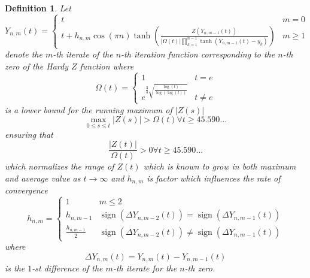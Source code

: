 \documentclass{elsarticle}
\newcommand{\tmop}[1]{\ensuremath{\operatorname{#1}}}
\newtheorem{definition}{Definition}
\begin{document}
\begin{definition}
  Let
  \[ Y_{n, m} (t) = \left\{ \begin{array}{ll}
       t & m = 0\\
       t + h_{n, m} \cos (\pi n) \tanh \left( \frac{Z (Y_{n, m - 1} (t))}{|
       \Omega (t) | \prod_{k = 1}^{n - 1} \tanh (Y_{n, m - 1} (t) - y_k)}
       \right) & m \geqslant 1
     \end{array} \right. \]
  denote the $m$-th iterate of the $n$-th iteration function corresponding to
  the $n$-th zero of the Hardy $Z$ function where
  \begin{equation}
    \Omega (t) = \left\{ \begin{array}{ll}
      1 & t = e\\
      e^{\frac{3}{4} \sqrt{\frac{\log (t)}{\log (\log (t))}}} & t \neq e
    \end{array} \right.
  \end{equation}
  is a lower bound for the running maximum of $| Z (s) |$
  \begin{equation}
    \max_{0 \leqslant s \leqslant t} | Z (s) | > \Omega (t) \forall t
    \geqslant 45.590 \ldots
  \end{equation}
  ensuring that
  \begin{equation}
    \frac{| Z (t) |}{\Omega (t)} > 0 \forall t \geqslant 45.590 \ldots
  \end{equation}
  which normalizes the range of $Z (t)$ which is known to grow in both maximum
  and average value as $t \rightarrow \infty$ and $h_{n, m}$ is factor which
  influences the rate of convergence
  \begin{equation}
    h_{n, m} = \left\{ \begin{array}{ll}
      1 & m \leqslant 2\\
      h_{n, m - 1} & \tmop{sign} (\Delta Y^{}_{n, m - 2} (t)) = \tmop{sign}
      (\Delta Y^{}_{n, m - 1} (t))\\
      \frac{h_{n, m - 1}}{2} & \tmop{sign} (\Delta Y^{}_{n, m - 2} (t)) \neq
      \tmop{sign} (\Delta Y^{}_{n, m - 1} (t))
    \end{array} \right.
  \end{equation}
  where
  \begin{equation}
    \Delta Y_{n, m} (t) = Y_{n, m} (t) - Y_{n, m - 1} (t)
  \end{equation}
  is the $1$-st difference of the $m$-th iterate for the $n$-th zero.
  {\cite[Theorem 3.2.3]{ramachandra1995lectures}} 
\end{definition}
\end{document}
